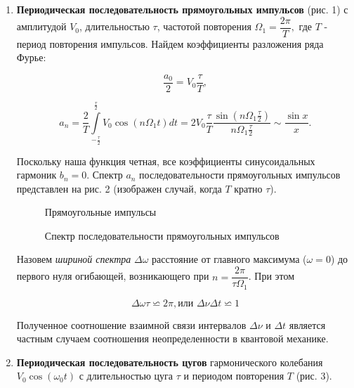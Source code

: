 \documentclass[a4paper,12pt]{article} %
\begin{document}
\begin{enumerate}
		
\item 	\textbf{Периодическая последовательность прямоугольных импульсов} (рис. 1) с амплитудой $V_{0}$, длительностью $\tau$, частотой повторения $\Omega_{1}=\dfrac{2\pi}{T},$ где $T$ - период повторения импульсов. Найдем коэффициенты разложения ряда Фурье:
	
$$\dfrac{a_{0}}{2}=V_{0}\dfrac{\tau}{T},$$

 \begin{equation}
     a_{n}=\dfrac{2}{T}\int\limits_{-\frac{\tau}{2}}^{\frac{\tau}{2}}V_{0}\cos(n \Omega_{1} t)dt=2V_{0}\dfrac{\tau}{T}\dfrac{\sin(n \Omega_{1} \frac{\tau}{2})}{n\Omega_{1}\frac{\tau}{2}} \sim \dfrac{\sin x}{x}.
    \label{eq4}
 \end{equation}

Поскольку наша функция четная, все коэффициенты синусоидальных гармоник $b_{n}=0$. Спектр $a_{n}$ последовательности прямоугольных импульсов представлен на рис. 2 (изображен случай, когда $T$ кратно $\tau$).
		
\begin{figure}[h]
    \begin{minipage}[h]{0.5\linewidth}
	\caption{Прямоугольные импульсы}
    \end{minipage}
    \begin{minipage}[h]{0.5\linewidth}
	\caption{Спектр последовательности прямоугольных импульсов}
    \end{minipage}
\end{figure}
	
Назовем \textit{шириной спектра} $\Delta \omega$ расстояние от главного максимума ($\omega =0$) до первого нуля огибающей, возникающего при $n=\dfrac{2\pi}{\tau \Omega_{1}}$. При этом 
	
\begin{equation}
	\Delta \omega \tau \backsimeq 2 \pi, \text{или }  \Delta \nu \Delta t \backsimeq 1
\label{eq5}
\end{equation}
		
Полученное соотношение взаимной связи интервалов $\Delta \nu$ и $\Delta t$ является частным случаем соотношения неопределенности в квантовой механике.
	
\item \textbf{Периодическая последовательность цугов} гармонического колебания $V_{0}\cos(\omega_{0}t)$ с длительностью цуга $\tau$ и периодом повторения $T$ (рис. 3).
	

\end{enumerate}
\end{document}
